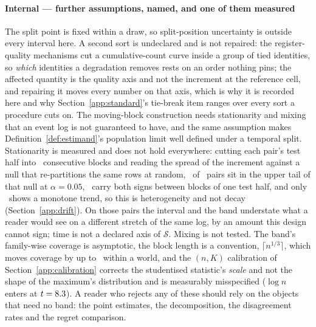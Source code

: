 \paragraph{Internal --- further assumptions, named, and one of them
measured}
The split point is fixed within a draw, so split-position uncertainty is
outside every interval here. A second sort is undeclared and is not repaired:
the register-quality mechanisms cut a cumulative-count curve inside a group
of tied identities, so \emph{which} identities a degradation removes rests on
an order nothing pins; the affected quantity is the quality axis and not the
increment at the reference cell, and repairing it moves every number on that
axis, which is why it is recorded here and why
Section~\ref{app:standard}'s tie-break item ranges over every sort a
procedure cuts on. The moving-block construction needs stationarity and
mixing that an event log is not guaranteed to have, and the same assumption
makes Definition~\ref{def:estimand}'s population limit well defined under a
temporal split. Stationarity is measured and does not hold everywhere:
cutting each pair's test half into \nDriftBlocks\ consecutive blocks and
reading the spread of the increment against a null that re-partitions the
same rows at random, \nDrifts\ of \nDriftPairs\ pairs sit in the upper tail
of that null at $\alpha = 0.05$, \nDriftSignVaries\ carry both signs between
blocks of one test half, and only \nDriftTrend\ shows a monotone trend, so
this is heterogeneity and not decay (Section~\ref{app:drift}). On those
pairs the interval and the band understate what a reader would see on a
different stretch of the same log, by an amount this design cannot sign;
time is not a declared axis of $\mathcal{S}$. Mixing is not tested. The
band's family-wise coverage is asymptotic, the block length is a convention,
$\lceil n^{1/3}\rceil$, which moves coverage by up to
\coverageBlockSpreadMaxPts\ within a world, and the $(n, K)$ calibration of
Section~\ref{app:calibration} corrects the studentised statistic's
\emph{scale} and not the shape of the maximum's distribution and is
measurably misspecified ($\log n$ enters at $t = 8.3$). A
reader who rejects any of these should rely on the objects that need no
band: the point estimates, the decomposition, the disagreement rates and the
regret comparison.

